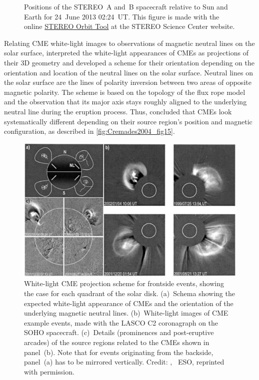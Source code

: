 \begin{figure}[htb]
\begin{floatrow}
{		}{
			\caption[]
			{Positions of the STEREO~A and~B spacecraft relative to Sun and Earth for 24~June 2013 02:24~UT. This figure is made with the online \href{https://stereo-ssc.nascom.nasa.gov/cgi-bin/make_where_gif}{STEREO Orbit Tool} at the STEREO Science Center website\protect\footnotemark.}
			\label{fig:STEREO_positions_w_269707595}
		}
	\end{floatrow}
\end{figure}

Relating CME white-light images to observations of magnetic neutral lines on the solar surface, \citet{Cremades2004} interpreted the white-light appearances of CMEs as projections of their 3D geometry and developed a scheme for their orientation depending on the orientation and location of the neutral lines on the solar surface. Neutral lines on the solar surface are the lines of polarity inversion between two areas of opposite magnetic polarity. The scheme is based on the topology of the flux rope model and the observation that its major axis stays roughly aligned to the underlying neutral line during the eruption process. Thus, \citet{Cremades2004} concluded that CMEs look systematically different depending on their source region's position and magnetic configuration, as described in \autoref{fig:Cremades2004_fig15}.
\begin{figure}[htb]
	\centering
	\includegraphics[width=\textwidth]{figures_of_others/images/Cremades2004_fig15.png}
	\caption[]
	{White-light CME projection scheme for frontside events, showing the case for each quadrant of the solar disk. (a)~Schema showing the expected white-light appearance of CMEs and the orientation of the underlying magnetic neutral lines. (b)~White-light images of CME example events, made with the LASCO C2 coronagraph on the SOHO spacecraft. (c)~Details (prominences and post-eruptive arcades) of the source regions related to the CMEs shown in panel~(b). Note that for events originating from the backside, panel~(a) has to be mirrored vertically. Credit: {\citet[Fig.~15]{Cremades2004}}, \textcopyright~ESO, reprinted with permission.}
	\label{fig:Cremades2004_fig15}
\end{figure}
